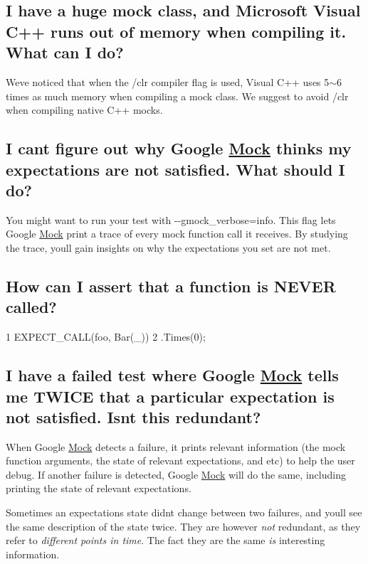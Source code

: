 \subsection*{I have a huge mock class, and Microsoft Visual C++ runs out of memory when compiling it. What can I do?}

We\textquotesingle{}ve noticed that when the {\ttfamily /clr} compiler flag is used, Visual C++ uses 5$\sim$6 times as much memory when compiling a mock class. We suggest to avoid {\ttfamily /clr} when compiling native C++ mocks.

\subsection*{I can\textquotesingle{}t figure out why Google \hyperlink{class_mock}{Mock} thinks my expectations are not satisfied. What should I do?}

You might want to run your test with {\ttfamily -\/-\/gmock\+\_\+verbose=info}. This flag lets Google \hyperlink{class_mock}{Mock} print a trace of every mock function call it receives. By studying the trace, you\textquotesingle{}ll gain insights on why the expectations you set are not met.

\subsection*{How can I assert that a function is N\+E\+V\+ER called?}


\begin{DoxyCode}
1 EXPECT\_CALL(foo, Bar(\_))
2     .Times(0);
\end{DoxyCode}


\subsection*{I have a failed test where Google \hyperlink{class_mock}{Mock} tells me T\+W\+I\+CE that a particular expectation is not satisfied. Isn\textquotesingle{}t this redundant?}

When Google \hyperlink{class_mock}{Mock} detects a failure, it prints relevant information (the mock function arguments, the state of relevant expectations, and etc) to help the user debug. If another failure is detected, Google \hyperlink{class_mock}{Mock} will do the same, including printing the state of relevant expectations.

Sometimes an expectation\textquotesingle{}s state didn\textquotesingle{}t change between two failures, and you\textquotesingle{}ll see the same description of the state twice. They are however {\itshape not} redundant, as they refer to {\itshape different points in time}. The fact they are the same {\itshape is} interesting information.

